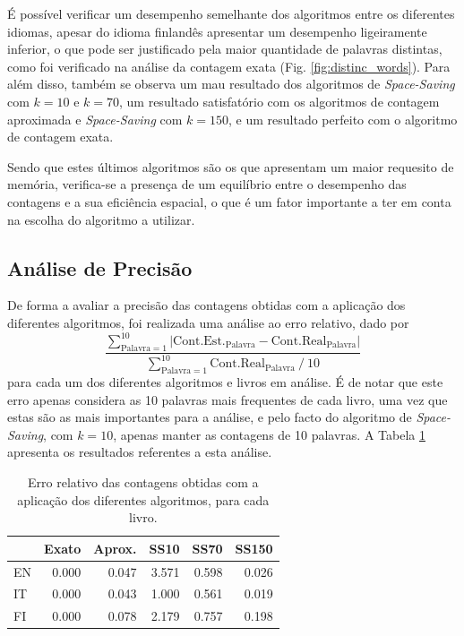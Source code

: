 \documentclass[mirror, portugues]{revdetua}
\begin{document}
É possível verificar um desempenho semelhante dos algoritmos entre os diferentes idiomas, apesar do idioma finlandês apresentar um desempenho ligeiramente inferior, o que pode ser justificado pela maior quantidade de palavras distintas, como foi verificado na análise da contagem exata (Fig. \ref{fig:distinc_words}). Para além disso, também se observa um mau resultado dos algoritmos de \textit{Space-Saving} com $k = 10$ e $k = 70$, um resultado satisfatório com os algoritmos de contagem aproximada e \textit{Space-Saving} com $k = 150$, e um resultado perfeito com o algoritmo de contagem exata.

Sendo que estes últimos algoritmos são os que apresentam um maior requesito de memória, verifica-se a presença de um equilíbrio entre o desempenho das contagens e a sua eficiência espacial, o que é um fator importante a ter em conta na escolha do algoritmo a utilizar.

\subsection{Análise de Precisão}

De forma a avaliar a precisão das contagens obtidas com a aplicação dos diferentes algoritmos, foi realizada uma análise ao erro relativo, dado por
$$
\frac{\sum^{10}_{\text{Palavra} = 1} | \text{Cont.Est.}_{\text{Palavra}} - \text{Cont.Real}_{\text{Palavra}} | }{\sum^{10}_{\text{Palavra} = 1} \text{Cont.Real}_{\text{Palavra}}\ /\ 10}
$$
para cada um dos diferentes algoritmos e livros em análise. É de notar que este erro apenas considera as 10 palavras mais frequentes de cada livro, uma vez que estas são as mais importantes para a análise, e pelo facto do algoritmo de \textit{Space-Saving}, com $k = 10$, apenas manter as contagens de 10 palavras. A Tabela \ref{table:erro_relativo} apresenta os resultados referentes a esta análise.

\begin{table}[H]
\centering
\caption{Erro relativo das contagens obtidas com a aplicação dos diferentes algoritmos, para cada livro.}
\label{table:erro_relativo}
\begin{tabular}{lrrrrr}
\toprule
& Exato & Aprox. & SS10 & SS70 & SS150 \\
\midrule
EN & 0.000 & 0.047 & 3.571 & 0.598 & 0.026 \\
IT & 0.000 & 0.043 & 1.000 & 0.561 & 0.019 \\
FI & 0.000 & 0.078 & 2.179 & 0.757 & 0.198 \\
\bottomrule
\end{tabular}
\end{table}
\end{document}
